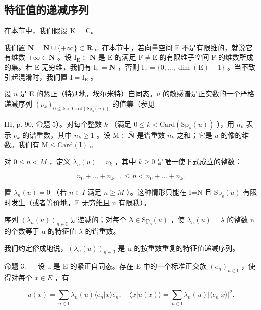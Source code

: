 \subsection{特征值的递减序列}

在本节中，我们假设 K = C。

我们置 \(\overline{\mathbf{N}} = \mathbf{N} \cup \{+\infty\} \subset \overline{\mathbf{R}}\) 。在本节中，若向量空间 E 不是有限维的，就说它有维数 \(+\infty \in \overline{\mathbf{N}}\) 。设 \(\mathrm{I_E} \subset \mathbf{N}\) 是 E 的满足 \(\mathrm{F} \neq \mathrm{E}\) 的有限维子空间 F 的维数所成的集。若 E 无穷维，我们有 \(\mathrm{I_E} = \mathbf{N}\) ，否则 \(\mathrm{I_E} = \{0, \ldots, \dim(\mathrm{E}) - 1\}\) 。当不致引起混淆时，我们置 \(\mathrm{I} = \mathrm{I_E}\) 。

设 \(u\) 是 E 的紧正（特别地，埃尔米特）自同态。\(u\) 的敏感谱是正实数的一个严格递减序列 \((\nu_{k})_{0\leqslant k<\mathrm{Card}(\mathrm{Sp}_{\mathrm{s}}(u))}\) 的值集（参见

III, p. 90, 命题 5）。对每个整数 \(k\) （满足 \(0 \leqslant k < \text{Card}(\text{Sp}_s(u))\) ），用 \(n_k\) 表示 \(\nu_k\) 的谱重数，其中 \(n_k \geqslant 1\) 。设 \(\text{M} \in \overline{\mathbf{N}}\) 是谱重数 \(n_k\) 之和；它是 \(u\) 的像的维数。我们有 \(\text{M} \leqslant \text{Card}(\text{I})\) 。

对 \(0 \leqslant n < M\) ，定义 \(\lambda_n(u) = \nu_k\) ，其中 \(k \geqslant 0\) 是唯一使下式成立的整数：

\[
n _ {0} + \dots + n _ {k - 1} \leqslant n <   n _ {0} + \dots + n _ {k}.
\]

置 \(\lambda_{n}(u)=0\) （若 \(n\in I\) 满足 \(n\geqslant M\) ）。这种情形只能在 I=N 且 \(\mathrm{Sp}_{\mathrm{s}}(u)\) 有限时发生（或者等价地，E 无穷维且 u 有限秩）。

序列 \((\lambda_{n}(u))_{n\in\mathrm{I}}\) 是递减的；对每个 \(\lambda\in\mathrm{Sp}_{\mathrm{s}}(u)\) ，使 \(\lambda_{n}(u)=\lambda\) 的整数 n 的个数等于 u 的特征值 \(\lambda\) 的谱重数。

我们约定俗成地说，\((\lambda_{n}(u))_{n\in\mathrm{J}}\) 是 u 的按重数重复的特征值递减序列。

命题 3. --- 设 u 是 E 的紧正自同态。存在 E 中的一个标准正交族 \((e_{n})_{n\in\mathrm{I}}\) ，使得对每个 \(x\in E\) ，有

\[
u (x) = \sum_ {n \in \mathrm{I}} \lambda_ {n} (u) \langle e _ {n} | x \rangle e _ {n}, \quad \langle x | u (x) \rangle = \sum_ {n \in \mathrm{I}} \lambda_ {n} (u) | \langle e _ {n} | x \rangle | ^ {2}.
\]

